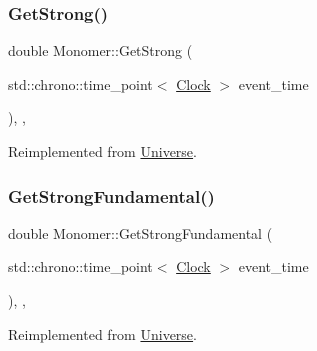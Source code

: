 \mbox{\label{classMonomer_aa35033340e88c46757d1d5ccba21a21e}} 
\subsubsection{\texorpdfstring{Get\+Strong()}{GetStrong()}}
{\footnotesize\ttfamily double Monomer\+::\+Get\+Strong (\begin{DoxyParamCaption}\item[{std\+::chrono\+::time\+\_\+point$<$ \mbox{\hyperlink{universe_8h_a0ef8d951d1ca5ab3cfaf7ab4c7a6fd80}{Clock}} $>$}]{event\+\_\+time }\end{DoxyParamCaption})\hspace{0.3cm}{\ttfamily [inline]}, {\ttfamily [final]}, {\ttfamily [virtual]}}



Reimplemented from \mbox{\hyperlink{classUniverse_acb453ce71da418c5b5617fecede9571b}{Universe}}.

\mbox{\label{classMonomer_a4bc8b39086260e26a196b28b4fc6667f}} 
\subsubsection{\texorpdfstring{Get\+Strong\+Fundamental()}{GetStrongFundamental()}}
{\footnotesize\ttfamily double Monomer\+::\+Get\+Strong\+Fundamental (\begin{DoxyParamCaption}\item[{std\+::chrono\+::time\+\_\+point$<$ \mbox{\hyperlink{universe_8h_a0ef8d951d1ca5ab3cfaf7ab4c7a6fd80}{Clock}} $>$}]{event\+\_\+time }\end{DoxyParamCaption})\hspace{0.3cm}{\ttfamily [inline]}, {\ttfamily [final]}, {\ttfamily [virtual]}}



Reimplemented from \mbox{\hyperlink{classUniverse_ab44daccba01ee7e3cf9b50bba83dd19e}{Universe}}.

\mbox{\label{classMonomer_a3b00168520f592098356f7cd3e663ad3}} 
